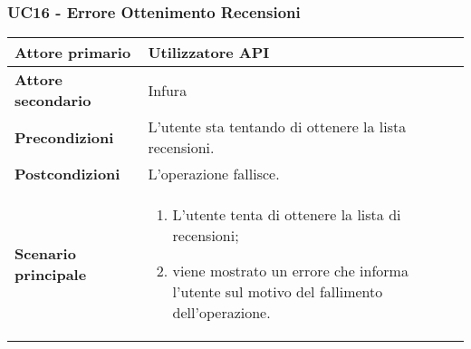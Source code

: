 \subsubsection{UC16 - Errore Ottenimento Recensioni}
\label{UC16}
\begin{center}
\renewcommand{\arraystretch}{1.5}
\begin{tabular}{ | m{10em} | m{20em} | }
    \hline
    \textbf{Attore primario} & Utilizzatore API \\
    \hline
    \textbf{Attore secondario} & Infura \\
    \hline
    \textbf{Precondizioni} & L'utente sta tentando di ottenere la lista recensioni. \\
    \hline
    \textbf{Postcondizioni} & L'operazione fallisce. \\
    \hline
    \textbf{Scenario principale} & \begin{enumerate}
        \item L'utente tenta di ottenere la lista di recensioni;
        \item viene mostrato un errore che informa l'utente sul motivo del fallimento
              dell'operazione.
    \end{enumerate} \\
    \hline
   \end{tabular}
\end{center}